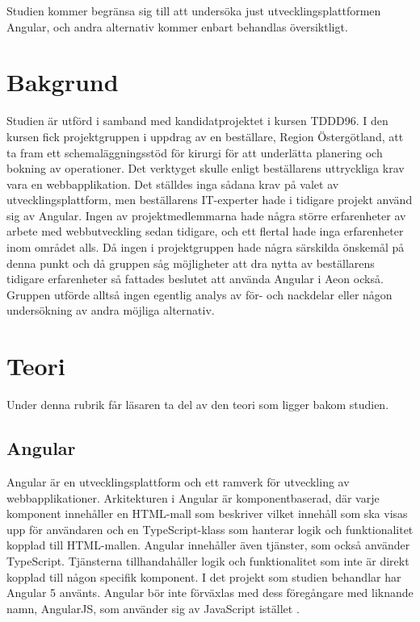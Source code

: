 Studien kommer begränsa sig till att undersöka just utvecklingsplattformen Angular, och andra alternativ kommer enbart behandlas översiktligt.

\section{Bakgrund}


Studien är utförd i samband med kandidatprojektet i kursen TDDD96. I den kursen fick projektgruppen i uppdrag av en beställare, Region Östergötland, att ta fram ett schemaläggningsstöd för kirurgi för att underlätta planering och bokning av operationer. Det verktyget skulle enligt beställarens uttryckliga krav vara en webbapplikation. Det ställdes inga sådana krav på valet av utvecklingsplattform, men beställarens IT-experter hade i tidigare projekt använd sig av Angular. Ingen av projektmedlemmarna hade några större erfarenheter av arbete med webbutveckling sedan tidigare, och ett flertal hade inga erfarenheter inom området alls. Då ingen i projektgruppen hade några särskilda önskemål på denna punkt och då gruppen såg möjligheter att dra nytta av beställarens tidigare erfarenheter så fattades beslutet att använda Angular i Aeon också. Gruppen utförde alltså ingen egentlig analys av för- och nackdelar eller någon undersökning av andra möjliga alternativ.  

\section{Teori}

Under denna rubrik får läsaren ta del av den teori som ligger bakom studien.

\subsection{Angular}

Angular är en utvecklingsplattform och ett ramverk för utveckling av webbapplikationer. Arkitekturen i Angular är komponentbaserad, där varje komponent innehåller en HTML-mall som beskriver vilket innehåll som ska visas upp för användaren och en TypeScript-klass som hanterar logik och funktionalitet kopplad till HTML-mallen. Angular innehåller även tjänster, som också använder TypeScript. Tjänsterna tillhandahåller logik och funktionalitet som inte är direkt kopplad till någon specifik komponent.  I det projekt som studien behandlar har Angular 5 använts. Angular bör inte förväxlas med dess föregångare med liknande namn, AngularJS, som använder sig av JavaScript istället \cite{angularguide}.

